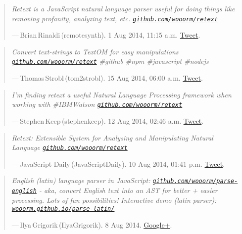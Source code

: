 \begin{quote}
  \textit{Retext is a JavaScript natural language parser useful for doing
    things like removing profanity, analyzing text, etc.
    \href{https://github.com/wooorm/retext}{\nolinkurl{github.com/wooorm/retext}}
  }

  \medskip ---\,Brian\,Rinaldi\,(remotesynth). 1 Aug 2014, 11:15 a.m.
  \href{https://twitter.com/remotesynth/status/495271619737423872}{Tweet}.
\end{quote}

\begin{quote}
  \textit{Convert text-strings to TextOM for easy manipulations
    \href{https://github.com/wooorm/retext}{\nolinkurl{github.com/wooorm/retext}}
    \#github \#npm \#javascript \#nodejs
  }

  \medskip ---\,Thomas\,Strobl\,(tom2strobl). 15 Aug 2014, 06:00 a.m.
  \href{https://twitter.com/tom2strobl/status/500265708866256896}{Tweet}.
\end{quote}

\begin{quote}
  \textit{I'm finding retext a useful Natural Language Processing
    framework when working with \#IBMWatson
    \href{https://github.com/wooorm/retext}{\nolinkurl{github.com/wooorm/retext}}
  }

  \medskip ---\,Stephen\,Keep\,(stephenkeep). 12 Aug 2014, 02:46 a.m.
  \href{https://twitter.com/stephenkeep/status/499129742407532545}{Tweet}.
\end{quote}

\begin{quote}
  \textit{Retext: Extensible System for Analysing and Manipulating Natural
    Language
    \href{https://github.com/wooorm/retext}{\nolinkurl{github.com/wooorm/retext}}
  }

  \medskip ---\,JavaScript Daily\,(JavaScriptDaily). 10 Aug 2014, 01:41 p.m.
  \href{https://twitter.com/JavaScriptDaily/status/498569727854522368}{Tweet}.
\end{quote}

\begin{quote}
  \textit{English (latin) language parser in JavaScript:
    \href{https://github.com/wooorm/parse-english}{\nolinkurl{github.com/wooorm/parse-english}}
    - aka, convert English text into an AST for better + easier processing.
    Lots of fun possibilities!
    Interactive demo (latin parser):
    \href{http://wooorm.github.io/parse-latin/}{\nolinkurl{wooorm.github.io/parse-latin/}}
  }

  \medskip ---\,Ilya\,Grigorik\,(IlyaGrigorik). 8 Aug 2014.
  \href{https://plus.google.com/+IlyaGrigorik/posts/RR75ZLceDHU}{Google+}.
\end{quote}


